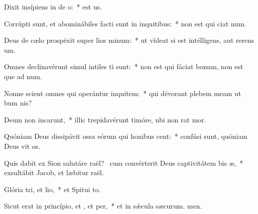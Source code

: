 \item Dixit insípiens in de o:~*  est us.
\item Corrúpti sunt, et abominábiles facti sunt in inquitibus:~* non est qui ciat num.
\item Deus de cælo prospéxit super lios minum:~* ut vídeat si est intélligens, aut rerens um.
\item Omnes declinavérunt simul intiles ti sunt:~* non est qui fáciat bonum, non est que ad num.
\item Nonne scient omnes qui operántur inquitem:~* qui dévorant plebem meam ut bum nis?
\item Deum non incarunt,~* illic trepidavérunt timóre, ubi non rat mor.
\item Quóniam Deus dissipávit ossa eórum qui honibus cent:~* confúsi sunt, quóniam Deus vit os.
\item Quis dabit ex Sion salutáre raël?~\pscross{} cum convérterit Deus captivitátem bis æ,~* exsultábit Jacob, et læbitur raël.
\item Glória tri, et lio,~* et Spitui to.
\item Sicut erat in princípio, et , et per,~* et in sǽcula sæcurum. men.
